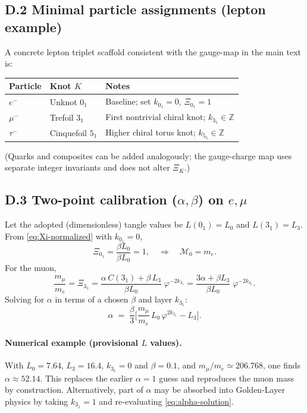\documentclass[11pt, preprint,titlepage]{revtex4-2}
\begin{document}
		\subsection*{D.2 Minimal particle assignments (lepton example)}
		A concrete lepton triplet scaffold consistent with the gauge-map in the main text is:
		\begin{center}
		\begin{tabular}{lll}
		\toprule
		Particle & Knot \(K\) & Notes \\
		\midrule
		\(e^-\)  & Unknot \(0_1\) & Baseline; set \(k_{0_1}=0\), \(\Xi_{0_1}=1\) \\
		\(\mu^-\) & Trefoil \(3_1\) & First nontrivial chiral knot; \(k_{3_1}\in\mathbb{Z}\) \\
		\(\tau^-\) & Cinquefoil \(5_1\) & Higher chiral torus knot; \(k_{5_1}\in\mathbb{Z}\) \\
		\bottomrule
		\end{tabular}
		\end{center}
		(Quarks and composites can be added analogously; the gauge-charge map uses separate integer invariants and does not alter \(\Xi_K\).)

		\subsection*{D.3 Two-point calibration (\texorpdfstring{\(\alpha,\beta\)}{alpha,beta}) on \texorpdfstring{\(e,\mu\)}{e,mu}}
		Let the adopted (dimensionless) tangle values be
		\(L(0_1)=L_0\) and \(L(3_1)=L_3\).
		From \eqref{eq:Xi-normalized} with \(k_{0_1}=0\),
		\[
		\Xi_{0_1}=\frac{\beta L_0}{\beta L_0}=1,
		\quad\Rightarrow\quad \mathcal{M}_0=m_e.
		\]
		For the muon,
		\[
		\frac{m_\mu}{m_e}
		= \Xi_{3_1}
		= \frac{\alpha\,C(3_1)+\beta\,L_3}{\beta L_0}\;\varphi^{-2k_{3_1}}
		= \frac{3\alpha+\beta L_3}{\beta L_0}\;\varphi^{-2k_{3_1}}.
		\]
		Solving for \(\alpha\) in terms of a chosen \(\beta\) and layer \(k_{3_1}\):
		\begin{equation}
		\alpha
		\;=\; \frac{\beta}{3}\Bigg[\frac{m_\mu}{m_e}\,L_0\,\varphi^{2k_{3_1}} - L_3\Bigg].
		\label{eq:alpha-solution}
		\end{equation}

		\paragraph{Numerical example (provisional \(L\) values).}
		With \(L_0=7.64\), \(L_3=16.4\), \(k_{3_1}=0\) and \(\beta=0.1\),
		and \(m_\mu/m_e\simeq 206.768\),
		one finds \(\alpha \approx 52.14\).
		This replaces the earlier \(\alpha=1\) guess and reproduces the muon mass by construction.
		Alternatively, part of \(\alpha\) may be absorbed into Golden-Layer physics by taking \(k_{3_1}=1\) and re-evaluating \eqref{eq:alpha-solution}.
\end{document}
